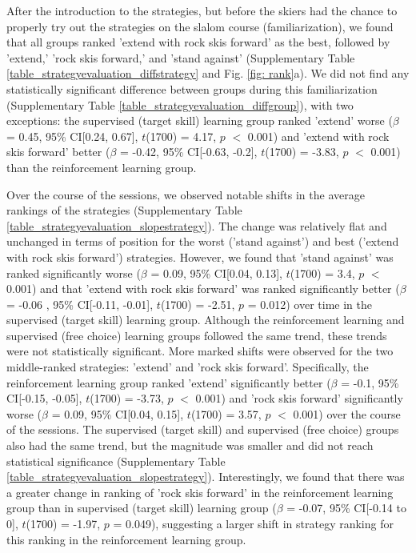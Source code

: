 \documentclass[pdflatex,sn-mathphys-num]{sn-jnl}%
\theoremstyle{thmstyleone}%
\theoremstyle{thmstyletwo}%
\theoremstyle{thmstylethree}%
\begin{document}
After the introduction to the strategies, but before the skiers had the chance to properly try out the strategies on the slalom course (familiarization), we found that all groups ranked 'extend with rock skis forward' as the best, followed by 'extend,' 'rock skis forward,' and 'stand against' (Supplementary Table \ref{table_strategyevaluation_diffstrategy} and Fig. \ref{fig: rank}a). We did not find any statistically significant difference between groups during this familiarization (Supplementary Table \ref{table_strategyevaluation_diffgroup}), with two exceptions: the supervised (target skill) learning group ranked 'extend' worse ($\beta$ = 0.45, 95\% CI[0.24,  0.67], $t$(1700) = 4.17, $p$ $<$ 0.001) and 'extend with rock skis forward' better  ($\beta$ = -0.42, 95\% CI[-0.63, -0.2], $t$(1700) = -3.83, $p$ $<$ 0.001) than the reinforcement learning group.

Over the course of the sessions, we observed notable shifts in the average rankings of the strategies (Supplementary Table \ref{table_strategyevaluation_slopestrategy}). The change was relatively flat and unchanged in terms of position for the worst ('stand against') and best ('extend with rock skis forward') strategies. However, we found that 'stand against' was ranked significantly worse ($\beta$ = 0.09, 95\% CI[0.04, 0.13], $t$(1700) = 3.4, $p$ $<$ 0.001)  and that 'extend with rock skis forward' was ranked significantly better ($\beta$ = -0.06 , 95\% CI[-0.11, -0.01], $t$(1700) = -2.51, $p$ = 0.012) over time in the supervised (target skill) learning group. Although the reinforcement learning and supervised (free choice) learning groups followed the same trend, these trends were not statistically significant. More marked shifts were observed for the two middle-ranked strategies: 'extend' and 'rock skis forward'. Specifically, the reinforcement learning group ranked 'extend' significantly better  ($\beta$ = -0.1, 95\% CI[-0.15, -0.05], $t$(1700) = -3.73, $p$ $<$ 0.001) and 'rock skis forward' significantly worse ($\beta$ = 0.09, 95\% CI[0.04, 0.15], $t$(1700) = 3.57, $p$ $<$ 0.001) over the course of the sessions. The supervised (target skill) and supervised (free choice) groups also had the same trend, but the magnitude was smaller and did not reach statistical significance (Supplementary Table \ref{table_strategyevaluation_slopestrategy}). Interestingly, we found that there was a greater change in ranking of 'rock skis forward' in the reinforcement learning group than in supervised (target skill) learning group ($\beta$ = -0.07, 95\% CI[-0.14 to 0], $t$(1700) = -1.97, $p$ = 0.049), suggesting a larger shift in strategy ranking for this ranking in the reinforcement learning group. 
\end{document}
